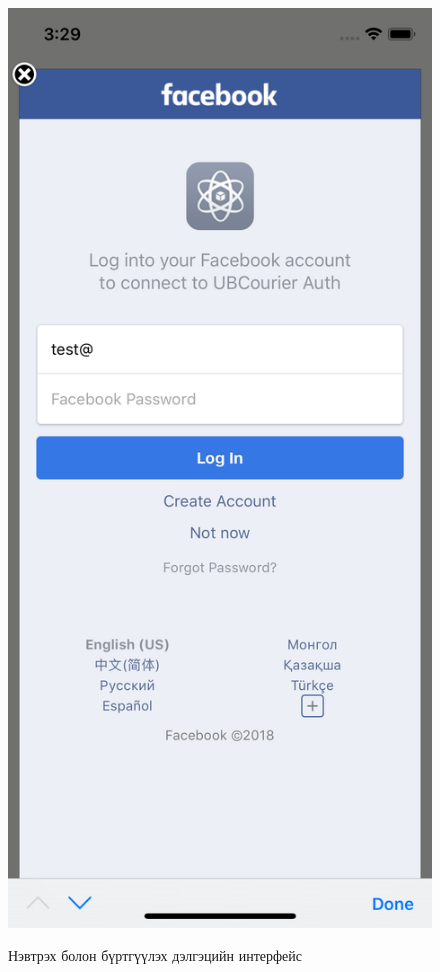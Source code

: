 \begin{figure}[H]
{        \includegraphics[height=.41\textheight, frame]{Figures/interfaces/interface4.png}
    }
    \hfill
	\caption{Нэвтрэх болон бүртгүүлэх дэлгэцийн интерфейс}
\end{figure}

